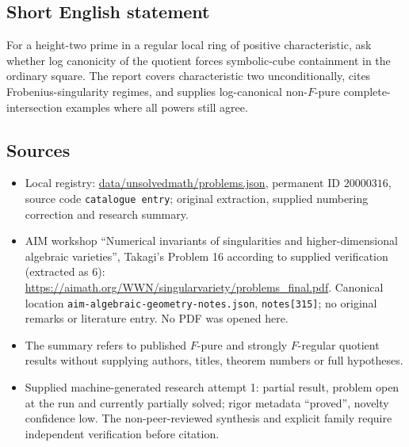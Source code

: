 \documentclass[11pt]{article}
\begin{document}
\subsection{Short English statement}
For a height-two prime in a regular local ring of positive characteristic, ask whether log canonicity of the quotient forces symbolic-cube containment in the ordinary square. The report covers characteristic two unconditionally, cites Frobenius-singularity regimes, and supplies log-canonical non-$F$-pure complete-intersection examples where all powers still agree.
\subsection{Sources}
\begin{itemize}
\item Local registry: \url{data/unsolvedmath/problems.json}, permanent ID $20000316$, source code \texttt{catalogue entry}; original extraction, supplied numbering correction and research summary.
\item AIM workshop ``Numerical invariants of singularities and higher-dimensional algebraic varieties'', Takagi's Problem 16 according to supplied verification (extracted as 6): \url{https://aimath.org/WWN/singularvariety/problems_final.pdf}. Canonical location \texttt{aim-algebraic-geometry-notes.json}, \texttt{notes[315]}; no original remarks or literature entry. No PDF was opened here.
\item The summary refers to published $F$-pure and strongly $F$-regular quotient results without supplying authors, titles, theorem numbers or full hypotheses.
\item Supplied machine-generated research attempt 1: partial result, problem open at the run and currently partially solved; rigor metadata ``proved'', novelty confidence low. The non-peer-reviewed synthesis and explicit family require independent verification before citation.
\end{itemize}
\end{document}
